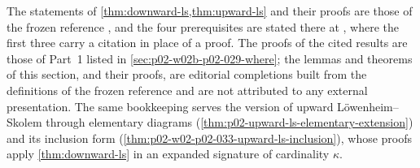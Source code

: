 The statements of \cref{thm:downward-ls,thm:upward-ls} and their proofs are
those of the frozen reference \cite[lines 5043--5131, section ``The
L\"owenheim--Skolem theorems'']{FrozenFormalLogicCompactnessApplications},
and the four prerequisites are stated there at
\cite[lines 657--660 (well-ordering theorem), 662--667 (cardinal
assignment), 679--694 (finite coding) and 696 onward (syntax
counting)]{FrozenFormalLogicFiniteCoding}, where the first three carry a
citation in place of a proof. The proofs of the cited
results are those of Part~1 listed in \cref{sec:p02-w02b-p02-029-where}; the
lemmas and theorems of this section, and their proofs, are editorial
completions built from the definitions of the frozen reference and are not
attributed to any external presentation. The same bookkeeping serves the
version of upward L\"owenheim--Skolem through elementary diagrams
(\cref{thm:p02-upward-ls-elementary-extension}) and its inclusion form
(\cref{thm:p02-w02-p02-033-upward-ls-inclusion}), whose proofs apply
\cref{thm:downward-ls} in an expanded signature of cardinality \(\kappa\).
